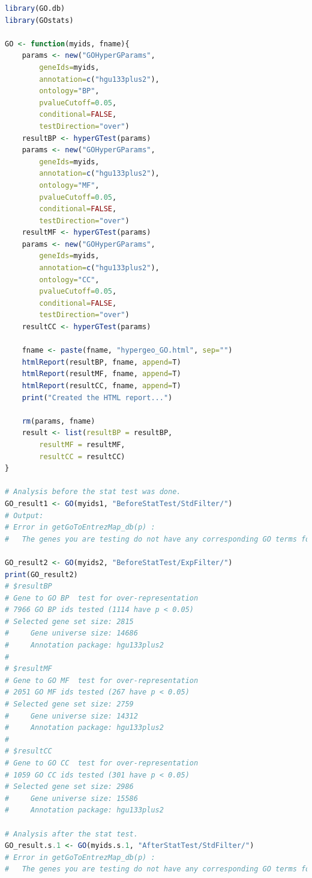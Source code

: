 \documentclass[oneside, a4paper, 11pt]{book}
\begin{document}
\begin{lstlisting}[language=R, caption=Gene Set Enrichment Analysis - GO categories]
library(GO.db)
library(GOstats)

GO <- function(myids, fname){
    params <- new("GOHyperGParams",
        geneIds=myids,
        annotation=c("hgu133plus2"),
        ontology="BP",
        pvalueCutoff=0.05,
        conditional=FALSE,
        testDirection="over")
    resultBP <- hyperGTest(params)
    params <- new("GOHyperGParams",
        geneIds=myids,
        annotation=c("hgu133plus2"),
        ontology="MF",
        pvalueCutoff=0.05,
        conditional=FALSE,
        testDirection="over")
    resultMF <- hyperGTest(params)
    params <- new("GOHyperGParams",
        geneIds=myids,
        annotation=c("hgu133plus2"),
        ontology="CC",
        pvalueCutoff=0.05,
        conditional=FALSE,
        testDirection="over")
    resultCC <- hyperGTest(params)

    fname <- paste(fname, "hypergeo_GO.html", sep="")
    htmlReport(resultBP, fname, append=T)
    htmlReport(resultMF, fname, append=T)
    htmlReport(resultCC, fname, append=T)
    print("Created the HTML report...")

    rm(params, fname)
    result <- list(resultBP = resultBP,
        resultMF = resultMF,
        resultCC = resultCC)
}

# Analysis before the stat test was done.
GO_result1 <- GO(myids1, "BeforeStatTest/StdFilter/")
# Output:
# Error in getGoToEntrezMap_db(p) : 
#   The genes you are testing do not have any corresponding GO terms for the ontology you are searching.

GO_result2 <- GO(myids2, "BeforeStatTest/ExpFilter/")
print(GO_result2)
# $resultBP
# Gene to GO BP  test for over-representation 
# 7966 GO BP ids tested (1114 have p < 0.05)
# Selected gene set size: 2815 
#     Gene universe size: 14686 
#     Annotation package: hgu133plus2 
# 
# $resultMF
# Gene to GO MF  test for over-representation 
# 2051 GO MF ids tested (267 have p < 0.05)
# Selected gene set size: 2759 
#     Gene universe size: 14312 
#     Annotation package: hgu133plus2 
# 
# $resultCC
# Gene to GO CC  test for over-representation 
# 1059 GO CC ids tested (301 have p < 0.05)
# Selected gene set size: 2986 
#     Gene universe size: 15586 
#     Annotation package: hgu133plus2

# Analysis after the stat test.
GO_result.s.1 <- GO(myids.s.1, "AfterStatTest/StdFilter/")
# Error in getGoToEntrezMap_db(p) : 
#   The genes you are testing do not have any corresponding GO terms for the ontology you are searching.


\end{lstlisting}
\end{document}
